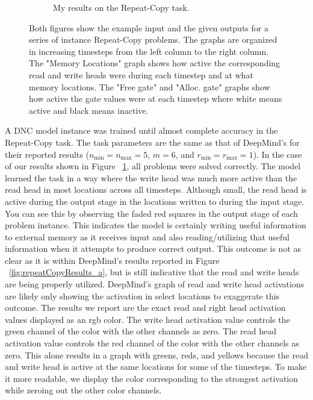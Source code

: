 \begin{figure}[!htb]
\begin{subfigure}{.9\textwidth}
    \caption{My results on the Repeat-Copy task.}
    \label{fig:repeatCopyResults_b}
\end{subfigure}
\caption{
    Both figures show the example input and the given outputs for a series of
    instance Repeat-Copy problems. The graphs are organized in increasing
    timesteps from the left column to the right column. The "Memory Locations"
    graph shows how active the corresponding read and write heads were during
    each timestep and at what memory locations. The "Free gate" and
    "Alloc. gate" graphs show how active the gate values were at each timestep
    where white means active and black means inactive.
}
\label{fig:repeatCopyResults}
\end{figure}

A DNC model instance was trained until almost complete accuracy in the
Repeat-Copy task. The task parameters are the same as that of DeepMind's for
their reported results ($n_{\textrm{min}} = n_{\textrm{max}} = 5$, $m = 6$, and
$r_{\textrm{min}} = r_{\textrm{max}} = 1$). In the case of our results shown in
Figure ~\ref{fig:repeatCopyResults_b}, all problems were solved correctly. The
model learned the task in a way where the write head was much more active than
the read head in most locations across all timesteps. Although small, the read
head is active during the output stage in the locations written to during the
input stage. You can see this by observing the faded red squares in the output
stage of each problem instance. This indicates the model is certainly writing
useful information to external memory as it receives input and also
reading/utilizing that useful information when it attempts to produce correct
output. This outcome is not as clear as it is within DeepMind's results
reported in Figure ~\ref{fig:repeatCopyResults_a}, but is still indicative that
the read and write heads are being properly utilized. DeepMind's graph of read
and write head activations are likely only showing the activation in select
locations to exaggerate this outcome. The results we report are the exact
read and right head activation values displayed as an rgb color. The write
head activation value controls the green channel of the color with the other
channels as zero. The read head activation value controls the red channel
of the color with the other channels as zero. This alone results in a graph
with greens, reds, and yellows because the read and write head is active at the
same locations for some of the timesteps. To make it more readable, we display
the color corresponding to the strongest activation while zeroing out the other
color channels.


